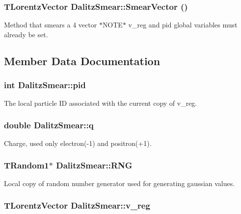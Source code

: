 \subsubsection{\setlength{\rightskip}{0pt plus 5cm}TLorentz\-Vector Dalitz\-Smear::Smear\-Vector ()}\label{classDalitzSmear_2461cb6cfeb9885b9fe9ac1c7992a814}


Method that smears a 4 vector $\ast$NOTE$\ast$ v\_\-reg and pid global variables must already be set. 



\subsection{Member Data Documentation}
\subsubsection{\setlength{\rightskip}{0pt plus 5cm}int \bf{Dalitz\-Smear::pid}}\label{classDalitzSmear_c7fd2ffdba0c574177bd5d6de605d7e5}


The local particle ID associated with the current copy of v\_\-reg. 

\subsubsection{\setlength{\rightskip}{0pt plus 5cm}double \bf{Dalitz\-Smear::q}}\label{classDalitzSmear_963895d9a71287579aaa90087c607081}


Charge, used only electron(-1) and positron(+1). 

\subsubsection{\setlength{\rightskip}{0pt plus 5cm}TRandom1$\ast$ \bf{Dalitz\-Smear::RNG}}\label{classDalitzSmear_bfb2d568818dbaa7db9936a52bd9c079}


Local copy of random number generator used for generating gaussian values. 

\subsubsection{\setlength{\rightskip}{0pt plus 5cm}TLorentz\-Vector \bf{Dalitz\-Smear::v\_\-reg}}\label{classDalitzSmear_9340d830c97814a02c2b2749e924abc8}


